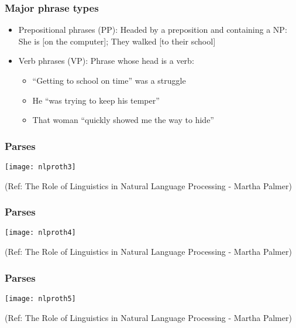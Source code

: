\begin{frame}[fragile]
  \frametitle{Major phrase types}
  \begin{itemize}
  \item Prepositional phrases (PP): Headed by  a preposition and containing a NP: She is [on the computer]; They walked [to their school] 
  \item Verb phrases (VP): Phrase whose head is a verb:
    \begin{itemize}
  \item ``Getting to school on time'' was a struggle
  \item He ``was trying to keep his temper''
  \item That woman ``quickly showed me the way to hide''
  \end{itemize}
  \end{itemize}
\end{frame}



\begin{frame}[fragile]
  \frametitle{Parses}
  \begin{center}
\texttt{[image: nlproth3]}
\end{center}



(Ref: The Role of Linguistics in  Natural Language Processing - 
Martha Palmer)
 \end{frame}
 
 
\begin{frame}[fragile]
  \frametitle{Parses}
  \begin{center}
\texttt{[image: nlproth4]}
\end{center}



(Ref: The Role of Linguistics in  Natural Language Processing - 
Martha Palmer)
 \end{frame}
 
\begin{frame}[fragile]
  \frametitle{Parses}
  \begin{center}
\texttt{[image: nlproth5]}
\end{center}



(Ref: The Role of Linguistics in  Natural Language Processing - 
Martha Palmer)
 \end{frame}
 
